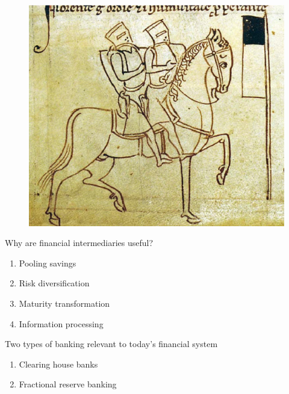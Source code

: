 \documentclass{beamer}
\begin{document}
\begin{frame}
  \begin{figure}
    \includegraphics[scale=.4]{templars.eps}
  \end{figure}
\end{frame}

\begin{frame}
 Why are financial intermediaries useful?
\begin{enumerate}
  \item Pooling savings  
  \item Risk diversification
  \item Maturity transformation
  \item Information processing  
\end{enumerate}
\end{frame}

\begin{frame}
 Two types of banking relevant to today's financial system
\begin{enumerate}
  \item Clearing house banks
  \item Fractional reserve banking
\end{enumerate}
\end{frame}
\end{document}
